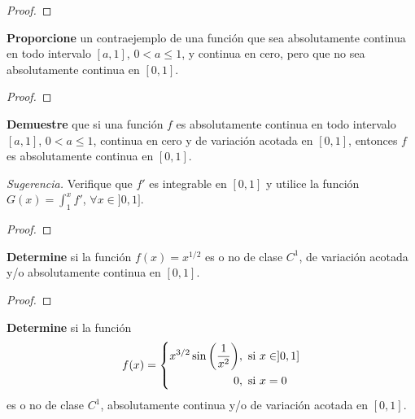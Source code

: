 \documentclass[12pt]{report}
\theoremstyle{largebreak}
\begin{document}
    \begin{proof}
        
    \end{proof}

    \begin{excer}
        \textbf{Proporcione} un contraejemplo de una función que sea absolutamente continua en todo intervalo $[a,1]$, $0< a\leq 1$, y continua en cero, pero que no sea absolutamente continua en $[0,1]$.
    \end{excer}

    \begin{proof}
        
    \end{proof}

    \begin{excer}
        \textbf{Demuestre} que si una función $f$ es absolutamente continua en todo intervalo $[a,1]$, $0< a\leq 1$, continua en cero y de variación acotada en $[0,1]$, entonces $f$ es absolutamente continua en $[0,1]$.
        
        \textit{Sugerencia.} Verifique que $f'$ es integrable en $[0,1]$ y utilice la función $G(x)=\int_{1}^{x}f'$, $\forall x\in]0,1]$.
    \end{excer}

    \begin{proof}
        
    \end{proof}

    \begin{excer}
        \textbf{Determine} si la función $f(x)=x^{1/2}$ es o no de clase $C^1$, de variación acotada y/o absolutamente continua en $[0,1]$.
    \end{excer}

    \begin{proof}
        
    \end{proof}

    \begin{excer}
        \textbf{Determine} si la función
        \begin{equation*}
            f(x) = 
                \left \{
                    \begin{aligned}
                    x^{3/2}\sin\left(\frac{1}{x^2}\right) &,\ \textup{si} \ x \in ]0,1]\\
                    0 &,\ \textup{si} \ x=0
                    \end{aligned}
                \right .
        \end{equation*}
        es o no de clase $C^1$, absolutamente continua y/o de variación acotada en $[0,1]$.
    \end{excer}
\end{document}
